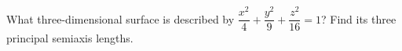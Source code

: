 What three-dimensional surface is described by $\dfrac{x^2}{4}+\dfrac{y^2}{9}+\dfrac{z^2}{16}=1$? Find its three principal semiaxis lengths.
